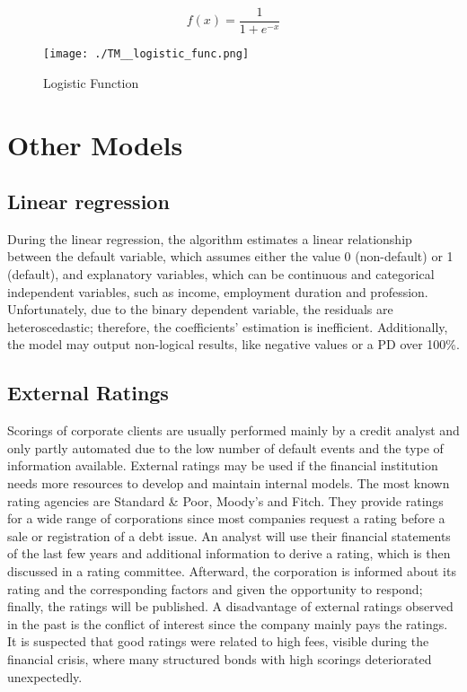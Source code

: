 \begin{figure}[H]
\begin{minipage}{.5\textwidth}
	\begin{equation}
	f(x) = \frac{1}{1 + e^{-x}}
	\end{equation}
\end{minipage}%
\begin{minipage}{.5\textwidth}
	\centering
	\texttt{[image: ./TM\_\_logistic\_func.png]}
\end{minipage}
    \caption{Logistic Function}
    \label{fig:tm_logfunc}
\end{figure}

\section{Other Models}

\subsection{Linear regression}
During the linear regression, the algorithm estimates a linear relationship between the default variable, which assumes either the value 0 (non-default) or 1 (default), and explanatory variables, which can be continuous and categorical independent variables, such as income, employment duration and profession. Unfortunately, due to the binary dependent variable, the residuals are heteroscedastic; therefore, the coefficients' estimation is inefficient. Additionally, the model may output non-logical results, like negative values or a PD over 100\%. \cite[pp.~39-40]{Witzany:2017}

\subsection{External Ratings}
Scorings of corporate clients are usually performed mainly by a credit analyst and only partly automated due to the low number of default events and the type of information available. External ratings may be used if the financial institution needs more resources to develop and maintain internal models. The most known rating agencies are Standard \& Poor, Moody's and Fitch. They provide ratings for a wide range of corporations since most companies request a rating before a sale or registration of a debt issue. An analyst will use their financial statements of the last few years and additional information to derive a rating, which is then discussed in a rating committee. Afterward, the corporation is informed about its rating and the corresponding factors and given the opportunity to respond; finally, the ratings will be published. A disadvantage of external ratings observed in the past is the conflict of interest since the company mainly pays the ratings. It is suspected that good ratings were related to high fees, visible during the financial crisis, where many structured bonds with high scorings deteriorated unexpectedly. \cite[pp.~34-36]{Witzany:2017}

